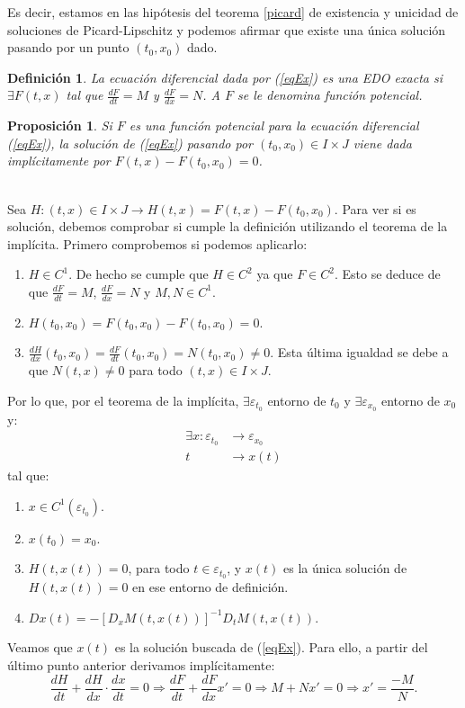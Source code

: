 \documentclass{article}
\makeatletter
\newcommand{\iindex}[1]{\emph{#1}\index{#1}}
\theoremstyle{theorem-style}  %
\newtheorem{proposition}[theorem]{Proposición}
\theoremstyle{definition-style}
\newtheorem{definition}{Definición}[section]
\theoremstyle{example-style}
\renewenvironment{proof}[1][\proofname]{\par
	\pushQED{\qed}%
	\normalfont \topsep6\p@\@plus6\p@\relax
	\list{}{%
		\settowidth{\leftmargin}{\quad:\hskip\labelsep}%
		\setlength{\labelwidth}{0pt}%
		\setlength{\itemindent}{-\leftmargin}%
	}%
	\item[\hskip\labelsep\itshape#1\@addpunct{:}]\ignorespaces
}{%
	\popQED\endlist\@endpefalse
}
\makeatother
\begin{document}
	Es decir, estamos en las hipótesis del teorema \ref{picard} de existencia y unicidad de soluciones de Picard-Lipschitz y podemos afirmar que existe una única solución pasando por un punto $ (t_0,x_0) $ dado.
\begin{definition}
	La ecuación diferencial dada por (\ref{eqEx}) es una \iindex{EDO exacta} si $\exists F(t, x)$ tal que $\frac{dF}{dt} = M$ y $\frac{dF}{dx} = N$. A $F$ se le denomina \iindex{función potencial}.
\end{definition}
\begin{proposition} \label{sol_exacta}
	Si $F$ es una función potencial para la ecuación diferencial (\ref{eqEx}), la solución de (\ref{eqEx}) pasando por $(t_0, x_0) \in I \times J$ viene dada implícitamente por $F(t, x) - F(t_0, x_0) = 0$.
\end{proposition}	
\begin{proof}\ \\
	Sea $H:(t, x) \in I \times J \longrightarrow H(t, x) = F(t, x) - F(t_0, x_0)$. Para ver si es solución, debemos comprobar si cumple  la definición utilizando el teorema de la implícita. Primero comprobemos si podemos aplicarlo:
	\begin{enumerate}
		\item $H \in C^1$. De hecho se cumple que $ H\in C^2 $ ya que $F \in C^2$. Esto se deduce de que $\frac{dF}{dt} = M$, $\frac{dF}{dx} = N$ y $M, N \in C^1$.
		\item $H(t_0, x_0) = F(t_0, x_0) - F(t_0, x_0) = 0$.
		\item $\frac{dH}{dx}(t_0, x_0) = \frac{dF}{dt}(t_0, x_0) = N(t_0, x_0) \neq 0$. Esta última igualdad se debe a que $N(t, x) \neq 0$ para todo $(t, x) \in I \times J$.
	\end{enumerate} 
	Por lo que, por el teorema de la implícita, $\exists \varepsilon_{t_0}$ entorno de $t_0$ y $\exists \varepsilon_{x_0}$ entorno de $x_0$ y:
	\begin{align*}
		\exists x : \varepsilon_{t_0} & \longrightarrow \varepsilon_{x_0} \\
		t & \longrightarrow x(t)
	\end{align*}
	tal que:
	\begin{enumerate}
		\item $x \in C^1(\varepsilon_{t_0})$.
		\item $x(t_0) = x_0$.
		\item $H(t, x(t)) = 0$, para todo $ t\in \varepsilon_{t_0} $, y $x(t)$ es la única solución de $H(t, x(t)) = 0$ en ese entorno de definición.
		\item $ D x(t)=-[D_x M(t,x(t))]^{-1}D_tM(t,x(t))$.
	\end{enumerate}
	Veamos que $x(t)$ es la solución buscada de (\ref{eqEx}). Para ello, a partir del último punto anterior derivamos implícitamente:
	\[\frac{dH}{dt} + \frac{dH}{dx} \cdot \frac{dx}{dt} = 0 \Rightarrow \frac{dF}{dt} + \frac{dF}{dx}x' = 0 \Rightarrow M + Nx' = 0 \Rightarrow x' = \frac{-M}{N}.\]
\end{proof}
\end{document}
